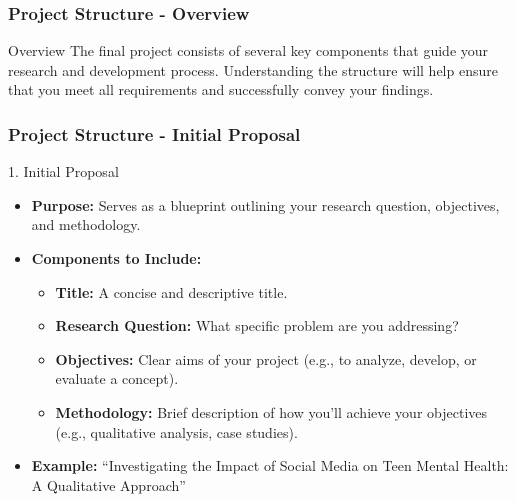 \documentclass[aspectratio=169]{beamer}
\begin{document}
\begin{frame}[fragile]
    \frametitle{Project Structure - Overview}
    \begin{block}{Overview}
        The final project consists of several key components that guide your research and development process. Understanding the structure will help ensure that you meet all requirements and successfully convey your findings.
    \end{block}
\end{frame}

\begin{frame}[fragile]
    \frametitle{Project Structure - Initial Proposal}
    \begin{block}{1. Initial Proposal}
        \begin{itemize}
            \item \textbf{Purpose:} Serves as a blueprint outlining your research question, objectives, and methodology.
            \item \textbf{Components to Include:}
                \begin{itemize}
                    \item \textbf{Title:} A concise and descriptive title.
                    \item \textbf{Research Question:} What specific problem are you addressing?
                    \item \textbf{Objectives:} Clear aims of your project (e.g., to analyze, develop, or evaluate a concept).
                    \item \textbf{Methodology:} Brief description of how you'll achieve your objectives (e.g., qualitative analysis, case studies).
                \end{itemize}
            \item \textbf{Example:} “Investigating the Impact of Social Media on Teen Mental Health: A Qualitative Approach”
        \end{itemize}
    \end{block}
\end{frame}
\end{document}
